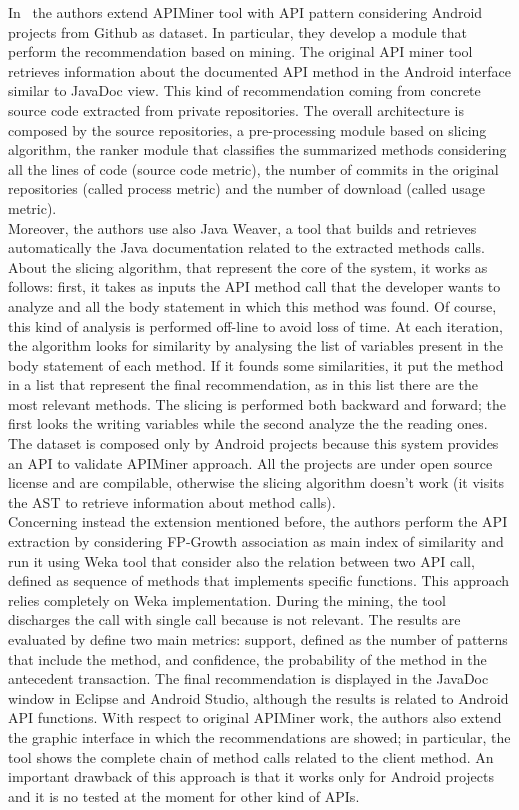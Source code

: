 In~\cite{borges_mining_2015} the authors extend APIMiner tool with API pattern 
considering Android projects from Github as dataset. In particular, they 
develop a module that perform the recommendation based on mining. The original 
API miner tool~\cite{montandon_documenting_2013}  retrieves information about 
the documented API method in the Android interface similar to JavaDoc view. 
This kind of recommendation coming from  concrete source code extracted from 
private repositories. The overall  architecture is composed by the source 
repositories, a pre-processing module based on slicing algorithm, the ranker 
module that classifies the summarized methods  considering all the lines of  
code (source code metric), the number of commits in the original repositories 
(called process metric) and the number of download (called usage metric). \\
Moreover, the authors use also Java Weaver, a tool that builds and retrieves automatically the Java documentation related to the extracted methods calls. About the slicing algorithm, that represent the core of the system, it works as follows: first, it takes as inputs the API method call that the developer wants to analyze and all the body statement in which this method was found. Of course, this kind of analysis is performed off-line to avoid loss of time. At each iteration, the algorithm looks for similarity by analysing the list of variables present in the body statement of each method. If it founds some similarities, it put the method in a list that represent the final recommendation, as in this list there are the most relevant methods. The slicing is performed both backward and forward; the first looks the writing variables while the second analyze the the reading ones. The dataset is composed only by Android projects because this system provides an API to validate APIMiner approach. All the projects are under open source license and are compilable, otherwise the slicing algorithm doesn't work (it visits the AST to retrieve information about method calls). \\
Concerning instead the extension mentioned before, the authors perform the API extraction by considering FP-Growth association as main index of similarity and run it using Weka tool that consider also the relation between two API call, defined as sequence of methods that implements specific functions. This approach relies completely on Weka implementation. During the mining, the tool discharges the call with single call because is not relevant. The results are evaluated by define two main metrics: support, defined as the number of patterns that include the method, and confidence, the probability of the method in the antecedent transaction. The final recommendation is displayed in the JavaDoc window in Eclipse and Android Studio, although the results is related to Android API functions. With respect to original APIMiner work, the authors also extend the graphic interface in which the recommendations are showed; in particular, the tool shows the complete chain of method calls related to the client method. An important drawback of this approach is that it works only for Android projects and it is no tested at the moment for other kind of APIs.

